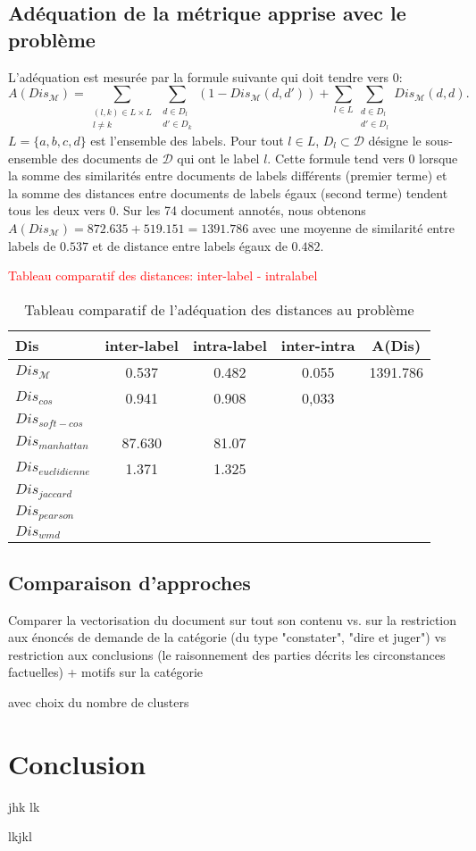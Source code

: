 \subsection{Adéquation de la métrique apprise avec le problème}
L'adéquation est mesurée par la formule suivante qui doit tendre vers 0: \[A(Dis_\mathcal{M}) = \sum\limits_{\substack{(l,k) \in L \times L \\ l \neq k}} \sum\limits_{\substack{d \in D_l \\ d' \in D_k}} \left(1 - Dis_\mathcal{M}(d,d')\right) + \sum\limits_{l \in L} \sum\limits_{\substack{d \in D_l \\ d' \in D_l}} Dis_\mathcal{M}(d,d). \] $L = \lbrace a, b, c, d \rbrace$ est l'ensemble des labels. Pour tout $l \in L$, $D_l \subset \mathcal{D}$ désigne le sous-ensemble des documents de $\mathcal{D}$ qui ont le label $l$. Cette formule tend vers 0 lorsque la somme des similarités entre documents de labels différents (premier terme) et la somme des distances entre documents de labels égaux (second terme) tendent tous les deux vers 0.
Sur les 74 document annotés, nous obtenons $A(Dis_\mathcal{M}) = 872.635 + 519.151 = 1391.786$ avec une moyenne de similarité entre labels de $0.537$ et de distance entre labels égaux de $0.482$.

\textcolor{red}{Tableau comparatif des distances: inter-label - intralabel}
\begin{table}[!htb]
	\centering
  \begin{tabular}{|l|c|c||c|c|}
  	\hline
	Dis & inter-label & intra-label & inter-intra & A(Dis) \\ \hline
	$Dis_\mathcal{M}$ &0.537&0.482&0.055& 1391.786 \\ \hline
	$Dis_{cos}$ &0.941&0.908&0,033&  \\ \hline
	$Dis_{soft-cos}$ &&&&  \\ \hline
	$Dis_{manhattan}$ &87.630&81.07&&  \\ \hline
	$Dis_{euclidienne}$ &1.371&1.325&&  \\ \hline
	$Dis_{jaccard}$ &&&&  \\ \hline
	$Dis_{pearson}$ &&&&  \\ \hline
	$Dis_{wmd}$ &&&&  \\ \hline	
  \end{tabular}
	\caption{Tableau comparatif de l'adéquation des distances au problème}
\end{table}

\subsection{Comparaison d'approches}
Comparer la vectorisation du document sur tout son contenu vs. sur la restriction aux énoncés de demande de la catégorie (du type "constater", "dire et juger") vs restriction aux conclusions (le raisonnement des parties décrits les circonstances factuelles) + motifs sur la catégorie

avec choix du nombre de clusters


\section{Conclusion}
\label{sec:similarite:conclusion}
jhk
lk

lkjkl